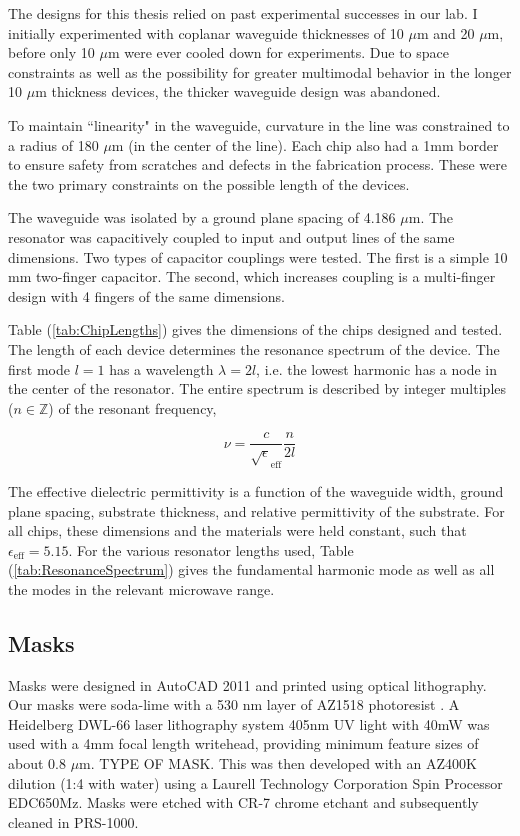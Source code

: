 \documentclass[11 pt, oneside]{book} %
\begin{document}
The designs for this thesis relied on past experimental successes in our lab. I initially experimented with coplanar waveguide thicknesses of 10 $\mu$m and 20 $\mu$m, before only 10 $\mu$m were ever cooled down for experiments. Due to space constraints as well as the possibility for greater multimodal behavior in the longer 10 $\mu$m thickness devices, the thicker waveguide design was abandoned. 

To maintain ``linearity" in the waveguide, curvature in the line was constrained to a radius of 180 $\mu$m (in the center of the line). Each chip also had a 1mm border to ensure safety from scratches and defects in the fabrication process. These were the two primary constraints on the possible length of the devices. 

The waveguide was isolated by a ground plane spacing of 4.186 $\mu$m. The resonator was capacitively coupled to input and output lines of the same dimensions. Two types of capacitor couplings were tested. The first is a simple 10 mm two-finger capacitor. The second, which increases coupling is a multi-finger design with 4 fingers of the same dimensions. 

Table (\ref{tab:ChipLengths}) gives the dimensions of the chips designed and tested. The length of each device determines the resonance spectrum of the device. The first mode $l=1$ has a wavelength $\lambda=2l$, i.e. the lowest harmonic has a node in the center of the resonator. The entire spectrum is described by integer multiples ($n \in \mathbb{Z}$) of the resonant frequency, 

\begin{equation}
\nu=\frac{c}{\sqrt\epsilon_{\mathrm{eff}}}\frac{n}{2l}
\end{equation}

The effective dielectric permittivity is a function of the waveguide width, ground plane spacing, substrate thickness, and relative permittivity of the substrate. For all chips, these dimensions and the materials were held constant, such that $\epsilon_{\mathrm{eff}}=5.15$. For the various resonator lengths used, Table (\ref{tab:ResonanceSpectrum}) gives the fundamental harmonic mode as well as all the modes in the relevant microwave range. 

\subsection{Masks}
Masks were designed in AutoCAD 2011 and printed using optical lithography. Our masks were soda-lime  with a 530 nm layer of AZ1518 photoresist . A Heidelberg DWL-66 laser lithography system 405nm UV light with 40mW was used with a 4mm focal length writehead, providing minimum feature sizes of about 0.8 $\mu$m. TYPE OF MASK. This was then developed with an AZ400K dilution (1:4 with water) using a Laurell Technology Corporation Spin Processor EDC650Mz. Masks were etched with CR-7 chrome etchant and subsequently cleaned in PRS-1000. 
\end{document}
